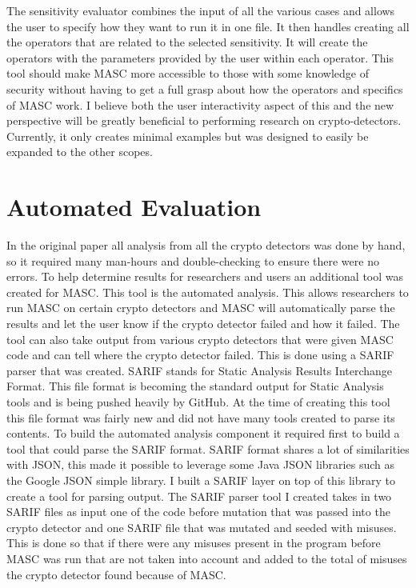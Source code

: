 The sensitivity evaluator combines the input of all the various cases and allows the user to specify how they want to run it in one file. It then handles creating all the operators that are related to the selected sensitivity. It will create the operators with the parameters provided by the user within each operator. This tool should make MASC more accessible to those with some knowledge of security without having to get a full grasp about how the operators and specifics of MASC work. I believe both the user interactivity aspect of this and the new perspective will be greatly beneficial to performing research on crypto-detectors. Currently, it only creates minimal examples but was designed to easily be expanded to the other scopes.


\section{Automated Evaluation}
\label{ch3:subsec:automation}

In the original paper all analysis from all the crypto detectors was done by hand, so it required many man-hours and double-checking to ensure there were no errors. To help determine results for researchers and users an additional tool was created for MASC. This tool is the automated analysis. This allows researchers to run MASC on certain crypto detectors and MASC will automatically parse the results and let the user know if the crypto detector failed and how it failed. The tool can also take output from various crypto detectors that were given MASC code and can tell where the crypto detector failed. This is done using a SARIF parser that was created. SARIF stands for Static Analysis Results Interchange Format. This file format is becoming the standard output for Static Analysis tools and is being pushed heavily by GitHub. At the time of creating this tool this file format was fairly new and did not have many tools created to parse its contents. To build the automated analysis component it required first to build a tool that could parse the SARIF format. SARIF format shares a lot of similarities with JSON, this made it possible to leverage some Java JSON libraries such as the Google JSON simple library. I built a SARIF layer on top of this library to create a tool for parsing output. The SARIF parser tool I created takes in two SARIF files as input one of the code before mutation that was passed into the crypto detector and one SARIF file that was mutated and seeded with misuses. This is done so that if there were any misuses present in the program before MASC was run that are not taken into account and added to the total of misuses the crypto detector found because of MASC. 

